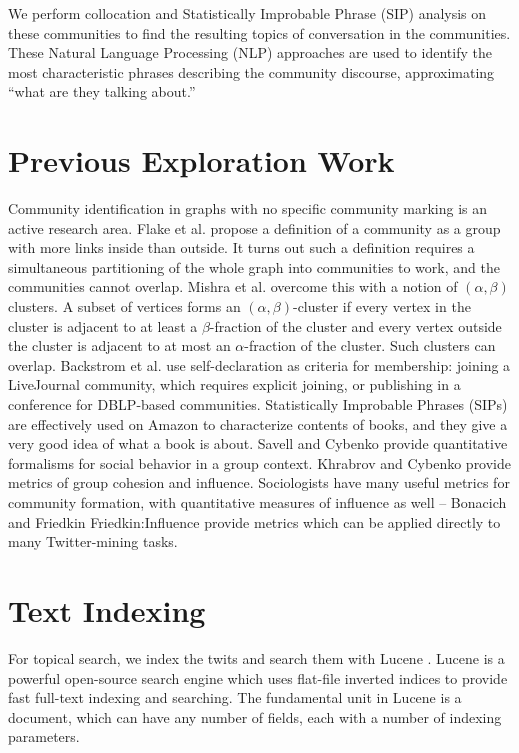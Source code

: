 \documentclass[10pt,oneside]{memoir}
\begin{document}
\begin{Spacing}{2}
We perform collocation and Statistically Improbable Phrase (SIP)
analysis on these communities to find the resulting topics of
conversation in the communities. These Natural Language Processing
(NLP) approaches are used to identify the most characteristic
phrases describing the community discourse, approximating
``what are they talking about.''


\pagebreak \section{Previous Exploration Work}
\label{previousexplorationwork}

Community identification in graphs with no specific community marking is an active research area. Flake et al. \cite{DBLP:conf/kdd/FlakeLG00} propose a definition of a community as a group with more links inside than outside. It turns out such a definition requires a simultaneous partitioning of the whole graph into communities to work, and the communities cannot overlap. Mishra et al. \cite{DBLP:conf/waw/MishraSST07} overcome this with a notion of $(\alpha,\beta)$ clusters. A subset of vertices forms an $(\alpha,\beta)$-cluster if every vertex in the cluster is adjacent to at least a $\beta$-fraction of the cluster and every vertex outside the cluster is adjacent to at most an $\alpha$-fraction of the cluster. Such clusters can overlap. Backstrom et al. \cite{DBLP:conf/kdd/BackstromHKL06} use self-declaration as criteria for membership: joining a LiveJournal community, which requires explicit joining, or publishing in a conference for DBLP-based communities. Statistically Improbable Phrases (SIPs) are effectively used on Amazon to characterize contents of books, and they give a very good idea of what a book is about. Savell and Cybenko \cite{Savell:2008:Intelligence} provide quantitative formalisms for social behavior in a group context. Khrabrov and Cybenko \cite{Khrabrov:2010:Dynamic} provide metrics of group cohesion and influence. Sociologists have many useful metrics for community formation, with quantitative measures of influence as well -- Bonacich \cite{Bonacich:2001:Coalitions} and Friedkin {Friedkin:Influence} provide metrics which can be applied directly to many Twitter-mining tasks.


\section{Text Indexing}
\label{textindexing}

For topical search, we index the twits and search them with Lucene
\cite{code:lucene}. Lucene is a powerful open-source search engine which
uses flat-file inverted indices to provide fast full-text indexing
and searching. The fundamental unit in Lucene is a document, which
can have any number of fields, each with a number of indexing
parameters.



\end{Spacing}
\end{document}
